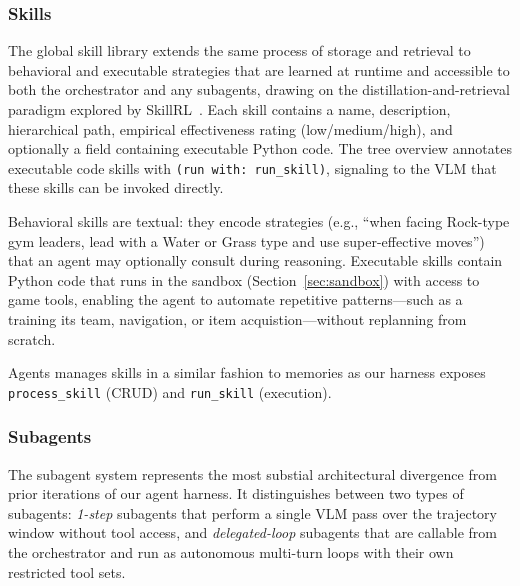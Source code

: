 \subsubsection{Skills}\label{sec:skills}

The global skill library extends the same process of storage and retrieval to behavioral and executable strategies that are learned at runtime and accessible to both the orchestrator and any subagents, drawing on the distillation-and-retrieval paradigm explored by SkillRL~\citep{xia2026skillrl}. Each skill contains a name, description, hierarchical path, empirical effectiveness rating (low/medium/high), and optionally a field containing executable Python code. The tree overview annotates executable code skills with \texttt{(run with: run\_skill)}, signaling to the VLM that these skills can be invoked directly.

Behavioral skills are textual: they encode strategies (e.g., ``when facing Rock-type gym leaders, lead with a Water or Grass type and use super-effective moves'') that an agent may optionally consult during reasoning. Executable skills contain Python code that runs in the sandbox (Section~\ref{sec:sandbox}) with access to game tools, enabling the agent to automate repetitive patterns---such as a training its team, navigation, or item acquistion---without replanning from scratch.

Agents manages skills in a similar fashion to memories as our harness exposes \texttt{process\_skill} (CRUD) and \texttt{run\_skill} (execution). 


\subsubsection{Subagents}\label{sec:subagents}

The subagent system represents the most substial architectural divergence from prior iterations of our agent harness. It distinguishes between two types of subagents: \emph{1-step} subagents that perform a single VLM pass over the trajectory window without tool access, and \emph{delegated-loop} subagents that are callable from the orchestrator and run as autonomous multi-turn loops with their own restricted tool sets.

